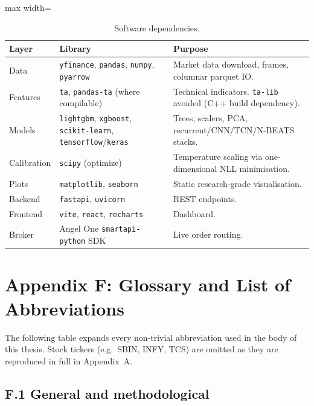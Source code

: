 \begin{table}[H]
\centering
\caption[]{Software dependencies.}
\renewcommand{\arraystretch}{1.3}
\begin{adjustbox}{max width=\textwidth}
\begin{tabularx}{\textwidth}{l X X}
\toprule
\textbf{Layer} & \textbf{Library} & \textbf{Purpose} \\
\midrule
Data       & \texttt{yfinance}, \texttt{pandas}, \texttt{numpy}, \texttt{pyarrow} & Market data download, frames, columnar parquet IO. \\
Features   & \texttt{ta}, \texttt{pandas-ta} (where compilable) & Technical indicators. \texttt{ta-lib} avoided (C++ build dependency). \\
Models     & \texttt{lightgbm}, \texttt{xgboost}, \texttt{scikit-learn}, \texttt{tensorflow}/\texttt{keras} & Trees, scalers, PCA, recurrent/CNN/TCN/N-BEATS stacks. \\
Calibration & \texttt{scipy} (optimize) & Temperature scaling via one-dimensional NLL minimisation. \\
Plots      & \texttt{matplotlib}, \texttt{seaborn} & Static research-grade visualisation. \\
Backend    & \texttt{fastapi}, \texttt{uvicorn} & REST endpoints. \\
Frontend   & \texttt{vite}, \texttt{react}, \texttt{recharts} & Dashboard. \\
Broker     & Angel One \texttt{smartapi-python} SDK & Live order routing. \\
\bottomrule
\end{tabularx}
\end{adjustbox}
\end{table}

\section*{Appendix F: Glossary and List of Abbreviations}

The following table expands every non-trivial abbreviation used in the body of this thesis. Stock tickers (e.g.\ SBIN, INFY, TCS) are omitted as they are reproduced in full in Appendix~A.

\subsection*{F.1 General and methodological}

